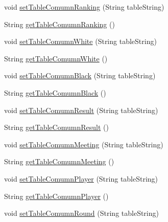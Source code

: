 \begin{DoxyCompactItemize}
void \hyperlink{classde_1_1turnierverwaltung_1_1control_1_1_properties_control_a52505d8cd188fc8ec80c4d19a8932fc0}{set\+Table\+Comumn\+Ranking} (String table\+String)
\item 
String \hyperlink{classde_1_1turnierverwaltung_1_1control_1_1_properties_control_a8584b9ab552fb0f4d80612f47e1ae8cd}{get\+Table\+Comumn\+Ranking} ()
\item 
void \hyperlink{classde_1_1turnierverwaltung_1_1control_1_1_properties_control_aa7d59e304ec298de88982c23c6c72c77}{set\+Table\+Comumn\+White} (String table\+String)
\item 
String \hyperlink{classde_1_1turnierverwaltung_1_1control_1_1_properties_control_acc1390146a270d9cb3d770cebc218c9d}{get\+Table\+Comumn\+White} ()
\item 
void \hyperlink{classde_1_1turnierverwaltung_1_1control_1_1_properties_control_a43eeb98046ab568fe9487ca9b4bd34be}{set\+Table\+Comumn\+Black} (String table\+String)
\item 
String \hyperlink{classde_1_1turnierverwaltung_1_1control_1_1_properties_control_a5b4601c45aac39574fd32eb607c7360b}{get\+Table\+Comumn\+Black} ()
\item 
void \hyperlink{classde_1_1turnierverwaltung_1_1control_1_1_properties_control_a31c5a426d9dad510ac19576c49f0504c}{set\+Table\+Comumn\+Result} (String table\+String)
\item 
String \hyperlink{classde_1_1turnierverwaltung_1_1control_1_1_properties_control_a811eaf00a46ddd1813c2c77872814cff}{get\+Table\+Comumn\+Result} ()
\item 
void \hyperlink{classde_1_1turnierverwaltung_1_1control_1_1_properties_control_a86a316fcecd81d1087031b9b7ac05e1d}{set\+Table\+Comumn\+Meeting} (String table\+String)
\item 
String \hyperlink{classde_1_1turnierverwaltung_1_1control_1_1_properties_control_a371cc4a2974ab0e4e12b2f0ee5be1e4f}{get\+Table\+Comumn\+Meeting} ()
\item 
void \hyperlink{classde_1_1turnierverwaltung_1_1control_1_1_properties_control_a22c880f94012d4153cfdb96363637201}{set\+Table\+Comumn\+Player} (String table\+String)
\item 
String \hyperlink{classde_1_1turnierverwaltung_1_1control_1_1_properties_control_ad75104b10af05ee7ae1a73810cc20b58}{get\+Table\+Comumn\+Player} ()
\item 
void \hyperlink{classde_1_1turnierverwaltung_1_1control_1_1_properties_control_ac77791c86e084277bdc696e8e7424501}{set\+Table\+Comumn\+Round} (String table\+String)

\end{DoxyCompactItemize}
